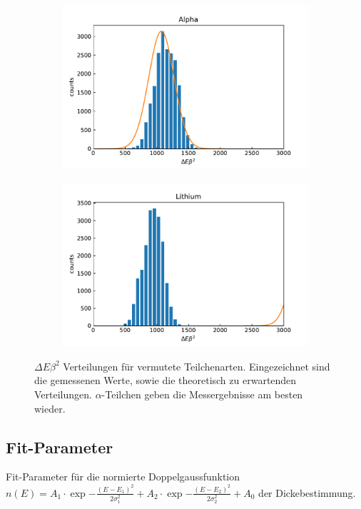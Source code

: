 \begin{figure}[ht]
	\begin{subfigure}[c]{0.45\textwidth}
		\centering
		\includegraphics[width=\textwidth]{dat/debeta_Alpha.pdf}
	\end{subfigure}
	\begin{subfigure}[c]{0.45\textwidth}
		\centering
		\includegraphics[width=\textwidth]{dat/debeta_Lithium.pdf}
	\end{subfigure}
	
	\caption{$\Delta E \beta^2$ Verteilungen für vermutete Teilchenarten. Eingezeichnet sind die gemessenen Werte, sowie die theoretisch zu erwartenden Verteilungen. $\alpha$-Teilchen geben die Messergebnisse am besten wieder.}
	\label{fig:debeta_full}
\end{figure}

\subsection{Fit-Parameter}
\label{sec:fitval}

\begin{table}[H]
	\centering
	\caption{Fit-Parameter für die normierte Doppelgaussfunktion \mbox{$n(E) = A_1 \cdot \exp{-\frac{(E - E_1)^2}{2 \sigma_1^2}} + A_2 \cdot \exp{-\frac{(E - E_2)^2}{2 \sigma_2^2}} + A_0$} der Dickebestimmung.}
	\label{tab:fitval1}
	
\end{table}